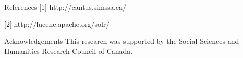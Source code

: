 \documentclass[final]{beamer}
\newcommand{\blockSpace}{\vskip 0.75ex}
\begin{document}
\begin{frame}[fragile,t]
\begin{columns}
\begin{column}{0.47\textwidth}
%

        \begin{block}{References}
        \footnotesize
		[1] http://cantus.simssa.ca/        
        
        [2] http://lucene.apache.org/solr/
        \end{block}   

        \begin{block}{Acknowledgements}
        \footnotesize
        This research was supported by the Social Sciences and Humanities Research Council of Canada.
        \end{block}

        \end{column}

\begin{column}{0.00\textwidth}
\end{column}
\end{columns}
\end{frame}
\end{document}
